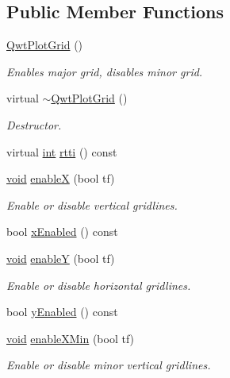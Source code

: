 \subsection*{Public Member Functions}
\begin{DoxyCompactItemize}
\item 
\hyperlink{class_qwt_plot_grid_a43001238f3024c15baa8ae61b29ae170}{Qwt\-Plot\-Grid} ()
\begin{DoxyCompactList}\small\item\em Enables major grid, disables minor grid. \end{DoxyCompactList}\item 
virtual \hyperlink{class_qwt_plot_grid_af39443cd91b8a96a797af1d6b78bfab3}{$\sim$\-Qwt\-Plot\-Grid} ()
\begin{DoxyCompactList}\small\item\em Destructor. \end{DoxyCompactList}\item 
virtual \hyperlink{ioapi_8h_a787fa3cf048117ba7123753c1e74fcd6}{int} \hyperlink{class_qwt_plot_grid_aae0d0b5afbc670dd257302b13601ea99}{rtti} () const 
\item 
\hyperlink{group___u_a_v_objects_plugin_ga444cf2ff3f0ecbe028adce838d373f5c}{void} \hyperlink{class_qwt_plot_grid_aba4de91f74f86e172e080fa62765bba8}{enable\-X} (bool tf)
\begin{DoxyCompactList}\small\item\em Enable or disable vertical gridlines. \end{DoxyCompactList}\item 
bool \hyperlink{class_qwt_plot_grid_a46d19c58295d538518586374efadd34c}{x\-Enabled} () const 
\item 
\hyperlink{group___u_a_v_objects_plugin_ga444cf2ff3f0ecbe028adce838d373f5c}{void} \hyperlink{class_qwt_plot_grid_a0172d8af861495a94aa856af26ad786d}{enable\-Y} (bool tf)
\begin{DoxyCompactList}\small\item\em Enable or disable horizontal gridlines. \end{DoxyCompactList}\item 
bool \hyperlink{class_qwt_plot_grid_ad0f38876f49c5197e929ab80e389dbb5}{y\-Enabled} () const 
\item 
\hyperlink{group___u_a_v_objects_plugin_ga444cf2ff3f0ecbe028adce838d373f5c}{void} \hyperlink{class_qwt_plot_grid_a4106c58c9d463bd4ccd94e215cc246bb}{enable\-X\-Min} (bool tf)
\begin{DoxyCompactList}\small\item\em Enable or disable minor vertical gridlines. \end{DoxyCompactList}\item 

\end{DoxyCompactItemize}
